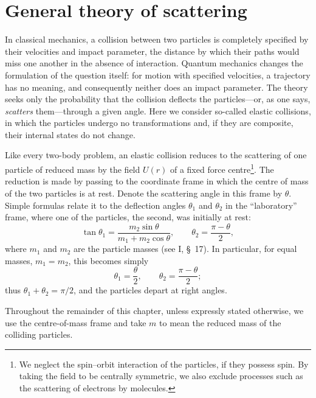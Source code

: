\section{General theory of scattering}

In classical mechanics, a collision between two particles is completely specified by their velocities and impact parameter, the distance by which their paths would miss one another in the absence of interaction. Quantum mechanics changes the formulation of the question itself: for motion with specified velocities, a trajectory has no meaning, and consequently neither does an impact parameter. The theory seeks only the probability that the collision deflects the particles---or, as one says, \emph{scatters} them---through a given angle. Here we consider so-called elastic collisions, in which the particles undergo no transformations and, if they are composite, their internal states do not change.

Like every two-body problem, an elastic collision reduces to the scattering of one particle of reduced mass by the field $U(r)$ of a fixed force centre\footnote{We neglect the spin--orbit interaction of the particles, if they possess spin. By taking the field to be centrally symmetric, we also exclude processes such as the scattering of electrons by molecules.}. The reduction is made by passing to the coordinate frame in which the centre of mass of the two particles is at rest. Denote the scattering angle in this frame by $\theta$. Simple formulas relate it to the deflection angles $\theta_1$ and $\theta_2$ in the ``laboratory'' frame, where one of the particles, the second, was initially at rest:
\begin{equation}
 \tan\theta_1=\frac{m_2\sin\theta}{m_1+m_2\cos\theta},\qquad
 \theta_2=\frac{\pi-\theta}{2},
 \tag{123.1}
\end{equation}
where $m_1$ and $m_2$ are the particle masses (see I, \S~17). In particular, for equal masses, $m_1=m_2$, this becomes simply
\begin{equation}
 \theta_1=\frac\theta2,\qquad \theta_2=\frac{\pi-\theta}{2};
 \tag{123.2}
\end{equation}
thus $\theta_1+\theta_2=\pi/2$, and the particles depart at right angles.

Throughout the remainder of this chapter, unless expressly stated otherwise, we use the centre-of-mass frame and take $m$ to mean the reduced mass of the colliding particles.

